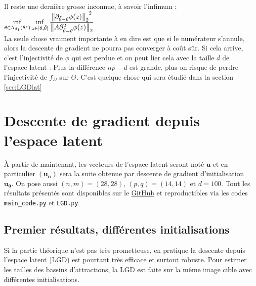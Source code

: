 \documentclass[hidelinks, french]{article} %
\renewcommand{\bf}[1]{\boldsymbol{#1}}
\theoremstyle{enonce}
\theoremstyle{special}
\theoremstyle{rq}
\theoremstyle{exo}
\theoremstyle{demo}
\begin{document}
Il reste une dernière grosse inconnue, à savoir l'infimum :\quad ${\displaystyle\inf_{\theta\in\Lambda_{\beta_1}(\theta^*)}\inf_{z\in[\theta,\Tilde{\theta}]}\frac{{\big\|\partial_{\Tilde{\theta}-\theta}\phi(z)\big\|_2}^2}{\big\|A\partial^2_{\Tilde{\theta}-\theta}\phi(z)\big\|_2}}$
\\
La seule chose vraiment importante à en dire est que si le numérateur s'annule, alors la descente de gradient ne pourra pas converger à coût sûr. Si cela arrive, c'est l'injectivité de $\phi$ qui est perdue et on peut lier cela avec la taille $d$ de l'espace latent : Plus la différence $np-d$ est grande, plus on risque de perdre l'injectivité de $f_D$ sur $\Theta$. C'est quelque chose qui sera étudié dans la section \ref{sec:LGDlat}



\newpage



\section{Descente de gradient depuis l'espace latent}\label{sec:LBD}

\`A partir de maintenant, les vecteurs de l'espace latent seront noté $\bf{u}$ et en particulier $(\bf{u_n})$ sera la suite obtenue par descente de gradient d'initialisation $\bf{u_0}$. On pose aussi $(n,m)=(28,28)$, $(p,q)=(14,14)$ et $d=100$. Tout les résultats présentés sont disponibles sur le  \href{https://github.com/GregoireDoat/StageM1.git}{GitHub} et reproductibles via les codes \texttt{main\_code.py} et \texttt{LGD.py}.



\subsection{Premier résultats, différentes initialisations}\label{sec:LDGinit}

Si la partie théorique n'est pas très prometteuse, en pratique la descente depuis l'espace latent (LGD) est pourtant très efficace et surtout robuste. Pour estimer les tailles des bassins d'attractions, la LGD est faite sur la même image cible avec différentes initialisations.
\end{document}
